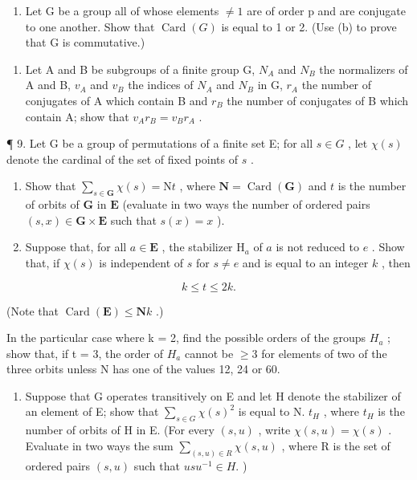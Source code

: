 \begin{enumerate}
\def\labelenumi{(\alph{enumi})}
\setcounter{enumi}{2}
\tightlist
\item
  Let G be a group all of whose elements \(\neq1\) are of order p and are conjugate to one another. Show that \(\operatorname{Card}(G)\) is equal to 1 or 2. (Use (b) to prove that G is commutative.)
\end{enumerate}

\begin{enumerate}
\def\labelenumi{\arabic{enumi}.}
\setcounter{enumi}{7}
\tightlist
\item
  Let A and B be subgroups of a finite group G, \(N_{A}\) and \(N_{B}\) the normalizers of A and B, \(v_{A}\) and \(v_{B}\) the indices of \(N_{A}\) and \(N_{B}\) in G, \(r_{A}\) the number of conjugates of A which contain B and \(r_{B}\) the number of conjugates of B which contain A; show that \(v_{A}r_{B} = v_{B}r_{A}\) .
\end{enumerate}

¶ 9. Let G be a group of permutations of a finite set E; for all \(s \in G\) , let \(\chi(s)\) denote the cardinal of the set of fixed points of \(s\) .

\begin{enumerate}
\def\labelenumi{(\alph{enumi})}
\item
  Show that \(\sum_{s\in \mathbf{G}}\chi (s) = \mathrm{N}t\) , where \(\mathbf{N} = \operatorname {Card}(\mathbf{G})\) and \(t\) is the number of orbits of \(\mathbf{G}\) in \(\mathbf{E}\) (evaluate in two ways the number of ordered pairs \((s,x)\in \mathbf{G}\times \mathbf{E}\) such that \(s(x) = x\) ).
\item
  Suppose that, for all \(a \in \mathbf{E}\) , the stabilizer \(\mathrm{H}_a\) of \(a\) is not reduced to \(e\) . Show that, if \(\chi(s)\) is independent of \(s\) for \(s \neq e\) and is equal to an integer \(k\) , then
\end{enumerate}

\[
k \leqslant t \leqslant 2 k.
\]

(Note that \(\operatorname{Card}(\mathbf{E}) \leqslant \mathbf{N}k\) .)

In the particular case where k = 2, find the possible orders of the groups \(H_{a}\) ; show that, if t = 3, the order of \(H_{a}\) cannot be \(\geqslant 3\) for elements of two of the three orbits unless N has one of the values 12, 24 or 60.

\begin{enumerate}
\def\labelenumi{(\alph{enumi})}
\setcounter{enumi}{2}
\tightlist
\item
  Suppose that G operates transitively on E and let H denote the stabilizer of an element of E; show that \(\sum_{s\in G}\chi(s)^{2}\) is equal to N. \(t_{H}\) , where \(t_{H}\) is the number of orbits of H in E. (For every \((s,u)\) , write \(\chi(s,u)=\chi(s)\) . Evaluate in two ways the sum \(\sum_{(s,u)\in R}\chi(s,u)\) , where R is the set of ordered pairs \((s,u)\) such that \(usu^{-1}\in H.\) )
\end{enumerate}

